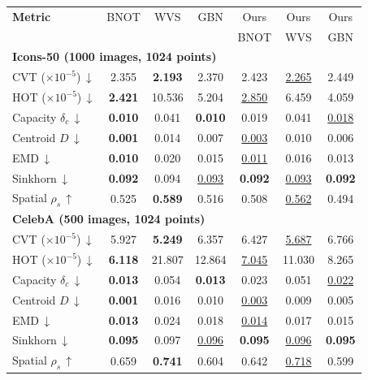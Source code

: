 \begin{table}[t]
\centering
\small
\setlength{\tabcolsep}{4pt}
\renewcommand{\arraystretch}{1.200}
\begin{tabular}{|l|c|c|c|c|c|c|}
\hline
\textbf{Metric} & BNOT & WVS & GBN & Ours & Ours & Ours \\
 & & & & BNOT & WVS & GBN \\
\hline
\multicolumn{7}{|l|}{\textbf{Icons-50 (1000 images, 1024 points)}} \\
\hline
CVT ($\times 10^{-5}$)\,$\downarrow$ & 2.355 & \textbf{2.193} & 2.370 & 2.423 & \underline{2.265} & 2.449 \\
HOT ($\times 10^{-5}$)\,$\downarrow$ & \textbf{2.421} & 10.536 & 5.204 & \underline{2.850} & 6.459 & 4.059 \\
Capacity $\delta_c$\,$\downarrow$ & \textbf{0.010} & 0.041 & \textbf{0.010} & 0.019 & 0.041 & \underline{0.018} \\
Centroid $D$\,$\downarrow$ & \textbf{0.001} & 0.014 & 0.007 & \underline{0.003} & 0.010 & 0.006 \\
EMD\,$\downarrow$ & \textbf{0.010} & 0.020 & 0.015 & \underline{0.011} & 0.016 & 0.013 \\
Sinkhorn\,$\downarrow$ & \textbf{0.092} & 0.094 & \underline{0.093} & \textbf{0.092} & \underline{0.093} & \textbf{0.092} \\
Spatial $\rho_s$\,$\uparrow$ & 0.525 & \textbf{0.589} & 0.516 & 0.508 & \underline{0.562} & 0.494 \\
\hline
\multicolumn{7}{|l|}{\textbf{CelebA (500 images, 1024 points)}} \\
\hline
CVT ($\times 10^{-5}$)\,$\downarrow$ & 5.927 & \textbf{5.249} & 6.357 & 6.427 & \underline{5.687} & 6.766 \\
HOT ($\times 10^{-5}$)\,$\downarrow$ & \textbf{6.118} & 21.807 & 12.864 & \underline{7.045} & 11.030 & 8.265 \\
Capacity $\delta_c$\,$\downarrow$ & \textbf{0.013} & 0.054 & \textbf{0.013} & 0.023 & 0.051 & \underline{0.022} \\
Centroid $D$\,$\downarrow$ & \textbf{0.001} & 0.016 & 0.010 & \underline{0.003} & 0.009 & 0.005 \\
EMD\,$\downarrow$ & \textbf{0.013} & 0.024 & 0.018 & \underline{0.014} & 0.017 & 0.015 \\
Sinkhorn\,$\downarrow$ & \textbf{0.095} & 0.097 & \underline{0.096} & \textbf{0.095} & \underline{0.096} & \textbf{0.095} \\
Spatial $\rho_s$\,$\uparrow$ & 0.659 & \textbf{0.741} & 0.604 & 0.642 & \underline{0.718} & 0.599 \\

\end{tabular}
\end{table}

